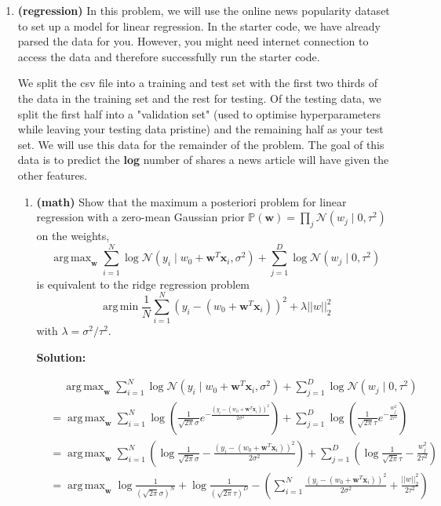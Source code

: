 \documentclass[letter,11pt]{article}
\newenvironment{solution}{
    \vspace{0.16in} {\bf Solution:}
    
}{
	\vspace{0.16in}
}
\DeclareMathOperator*{\argmax}{arg\,max}
\DeclareMathOperator*{\argmin}{arg\,min}
\begin{document}
\begin{enumerate}
    \newpage


    \item \textbf{(regression)} In this problem, we will use the online news popularity dataset to set up a model for linear regression. In the starter code, we have already parsed the data for you. However, you might need internet connection to access the data and therefore successfully run the starter code.

    We split the csv file into a training and test set with the first two thirds of the data in the training set and the rest for testing. Of the testing data, we split the first half into a "validation set" (used to optimise hyperparameters while leaving your testing data pristine) and the remaining half as your test set. We will use this data for the remainder of the problem. The goal of this data is to predict the \textbf{log} number of shares a news article will have given the other features.

    \begin{enumerate}
        \item \textbf{(math)} Show that the maximum a posteriori problem for linear regression with a zero-mean Gaussian prior $\mathbb{P}(\textbf{w}) = \prod_j \mathcal{N}(w_j \mid 0, \tau^2)$ on the weights, \[\argmax_{\textbf{w}} \sum_{i=1}^N \log \mathcal{N}(y_i \mid w_0 + \textbf{w}^T \textbf{x}_i, \sigma^2) + \sum_{j=1}^D \log \mathcal{N}(w_j \mid 0, \tau^2)\] is equivalent to the ridge regression problem \[\argmin \frac{1}{N} \sum_{i=1}^N (y_i - (w_0 + \textbf{w}^T \textbf{x}_i))^2 + \lambda ||w||_2^2\] with $\lambda = \sigma^2/\tau^2$.

        \begin{solution}
            \begin{align*}
                &\quad\: \argmax_{\textbf{w}} \sum_{i=1}^N \log \mathcal{N}(y_i \mid w_0 + \textbf{w}^T \textbf{x}_i, \sigma^2) + \sum_{j=1}^D \log \mathcal{N}(w_j \mid 0, \tau^2) \\
                &= \argmax_{\textbf{w}} \sum_{i=1}^N \log \left( \frac{1}{\sqrt{2\pi}\sigma} e^{-\frac{(y_i - (w_0 + \mathbf{w}^T \mathbf{x}_i))^2}{2\sigma^2}} \right) + \sum_{j=1}^D \log \left( \frac{1}{\sqrt{2\pi}\tau} e^{-\frac{w_j^2}{2\tau^2}} \right) \\
                &= \argmax_{\textbf{w}} \sum_{i=1}^N \left(\log \frac{1}{\sqrt{2\pi}\sigma} - \frac{(y_i - (w_0 + \mathbf{w}^T \mathbf{x}_i))^2}{2\sigma^2}\right) + \sum_{j=1}^D \left( \log\frac{1}{\sqrt{2\pi}\tau} - \frac{w_j^2}{2\tau^2} \right) \\
                &= \argmax_{\textbf{w}} \log \frac{1}{(\sqrt{2\pi}\sigma)^N} + \log \frac{1}{(\sqrt{2\pi}\tau)^D} - \left(\sum_{i=1}^N \frac{(y_i - (w_0 + \mathbf{w}^T \mathbf{x}_i))^2}{2\sigma^2} + \frac{||w||_2^2}{2\tau^2} \right)
            \end{align*}


\end{solution}
\end{enumerate}
\end{enumerate}
\end{document}
